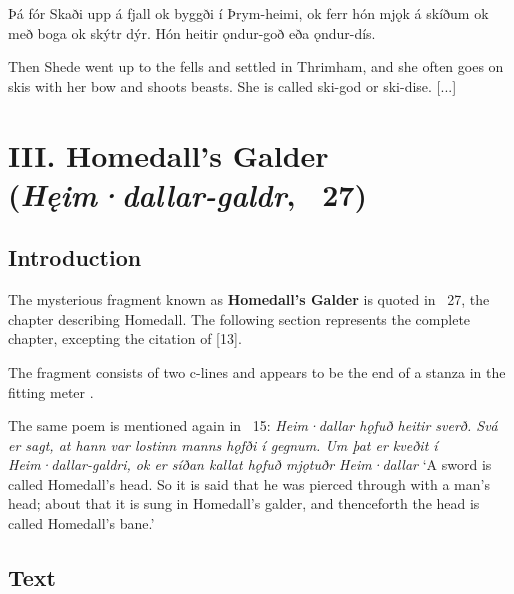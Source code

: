 \bpg\bpa[0]%
\pva[12]Þá fór Skaði upp á fjall ok byggði í Þrym-heimi,
\pva ok ferr hón mjǫk á skíðum ok með boga ok skýtr dýr.
\pva Hón heitir ǫndur-goð eða ǫndur-dís. \epa

\bpb\pvb[12]%
Then Shede went up to the fells and settled in Thrimham,
\pvb and she often goes on skis with her bow and shoots beasts.
\pvb She is called ski-god or ski-dise. [...]\epb\epg

\sectionline

\newpage

\section{III. Homedall’s Galder (\emph{Hęim·dallar-galdr}, \Gylfaginning~27)}\chapterStart%
%

\subsection{Introduction}

The mysterious fragment known as \textbf{Homedall’s Galder} is quoted in \Gylfaginning~27, the chapter describing Homedall.  The following section represents the complete chapter, excepting the citation of [13].

The fragment consists of two c-lines and appears to be the end of a stanza in the fitting meter \Galdralag.

The same poem is mentioned again in \Skaldskaparmal\ 15: \emph{Heim·dallar hǫfuð heitir sverð. Svá er sagt, at hann var lostinn manns hǫfði í gegnum. Um þat er kveðit í Heim·dallar-galdri, ok er síðan kallat hǫfuð mjǫtuðr Heim·dallar} ‘A sword is called Homedall’s head. So it is said that he was pierced through with a man’s head; about that it is sung in Homedall’s galder, and thenceforth the head is called Homedall’s bane.’

\subsection{Text}

